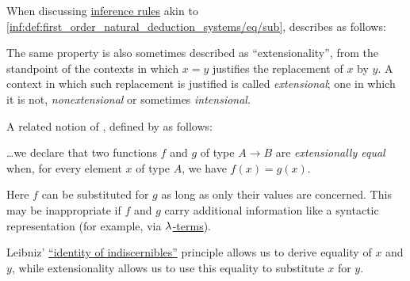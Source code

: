 \begin{concept}\label{con:extensionality}
  When discussing \hyperref[def:inference_rule]{inference rules} akin to \ref{inf:def:first_order_natural_deduction_systems/eq/sub},  describes  as follows:
  \begin{displayquote}
    The same property is also sometimes described as \enquote{extensionality}, from the standpoint of the contexts in which \( x = y \) justifies the replacement of \( x \) by \( y \). A context in which such replacement is justified is called \textit{extensional}; one in which it is not, \textit{nonextensional} or sometimes \textit{intensional}.
  \end{displayquote}

  A related notion of , defined by  as follows:
  \begin{displayquote}
    \ldots we declare that two functions \( f \) and \( g \) of type \( A \to B \) are \textit{extensionally equal} when, for every element \( x \) of type \( A \), we have \( f(x) = g(x) \).
  \end{displayquote}

  Here \( f \) can be substituted for \( g \) as long as only their values are concerned. This may be inappropriate if \( f \) and \( g \) carry additional information like a syntactic representation (for example, via \hyperref[def:lambda_term]{\( {\mathrm \lambda} \)-terms}).
\end{concept}
\begin{comments}
  \item Leibniz' \hyperref[rem:identity_of_indiscernibles]{\enquote{identity of indiscernibles}} principle allows us to derive equality of \( x \) and \( y \), while extensionality allows us to use this equality to substitute \( x \) for \( y \).
\end{comments}

